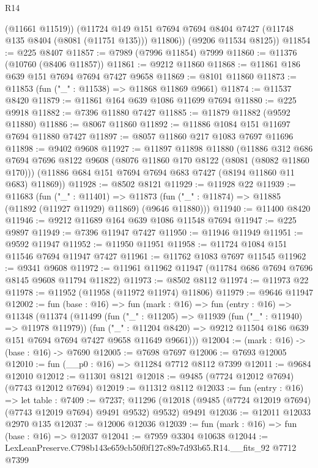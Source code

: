 \begin{lexlean}{R14}
\begin{coremodule}
          (@11661 @11519))
        (@11724 @149 @151 @7694 @7694 @8404 @7427 (@11748 @135 @8404 (@8081 (@11751 @135))) @11806))
      (@9206 @11534 @8125))
@11854 := @225 @8407
@11857 := @7989 (@7996 @11854) @7999
@11860 := @11376 (@10760 (@8406 @11857))
@11861 := @9212 @11860
@11868 := @11861 @186 @639 @151 @7694 @7694 @7427 @9658
@11869 := @8101 @11860
@11873 := @11853 (fun ("_" : @11538) => @11868 @11869 @9661)
@11874 := @11537 @8420
@11879 := @11861 @164 @639 @1086 @11699 @7694
@11880 := @225 @9918
@11882 := @7396 @11880 @7427
@11885 := @11879 @11882 (@9592 @11880)
@11886 := @8067 @11860
@11892 := @11886 @1084 @151 @11697 @7694 @11880 @7427
@11897 := @8057 @11860 @217 @1083 @7697 @11696
@11898 := @9402 @9608
@11927 := @11897
    @11898
    @11880
    (@11886
      @312
      @686
      @7694
      @7696
      @8122
      @9608
      (@8076 @11860 @170 @8122 (@8081 (@8082 @11860 @170)))
      (@11886 @684 @151 @7694 @7694 @683 @7427 (@8194 @11860 @11 @683) @11869))
@11928 := @8502 @8121
@11929 := @11928 @22
@11939 := @11683
    (fun ("_" : @11401) =>
    @11873 (fun ("_" : @11874) => @11885 (@11892 (@11927 @11929) @11869) (@9646 @11880)))
@11940 := @11400 @8420
@11946 := @9212 @11689 @164 @639 @1086 @11548 @7694
@11947 := @225 @9897
@11949 := @7396 @11947 @7427
@11950 := @11946 @11949
@11951 := @9592 @11947
@11952 := @11950 @11951
@11958 := @11724 @1084 @151 @11546 @7694 @11947 @7427
@11961 := @11762 @1083 @7697 @11545
@11962 := @9341 @9608
@11972 := @11961 @11962 @11947 (@11784 @686 @7694 @7696 @8145 @9608 @11794 @11822)
@11973 := @8502 @8112
@11974 := @11973 @22
@11978 := @11952 (@11958 (@11972 @11974) @11806)
@11979 := @9646 @11947
@12002 := fun (base : @16) =>
  fun (mark : @16) =>
  fun (entry : @16) =>
  @11348
    (@11374
      (@11499
        (fun ("_" : @11205) => @11939 (fun ("_" : @11940) => @11978 @11979))
        (fun ("_" : @11204 @8420) =>
        @9212 @11504 @186 @639 @151 @7694 @7694 @7427 @9658 @11649 @9661)))
@12004 := (mark : @16) -> (base : @16) -> @7690
@12005 := @7698 @7697
@12006 := @7693 @12005
@12010 := fun (__p0 : @16) => @11284 @7712 @8112 @7399
@12011 := @9684 @12010
@12012 := @11301 @8121
@12018 := @9485 (@7724 @12012 @7694) (@7743 @12012 @7694)
@12019 := @11312 @8112
@12033 := fun (entry : @16) =>
  let table : @7409 := @7237;
  @11296 (@12018 (@9485 (@7724 @12019 @7694) (@7743 @12019 @7694) @9491 @9532) @9532) @9491
@12036 := @12011 @12033 @2970 @135
@12037 := @12006 @12036
@12039 := fun (mark : @16) => fun (base : @16) => @12037
@12041 := @7959 @3304 @10638
@12044 := LexLeanPreserve.C798b143e659cb50f0f127c89e7d93b65.R14.__fits_92 @7712 @7399

\end{coremodule}
\end{lexlean}
